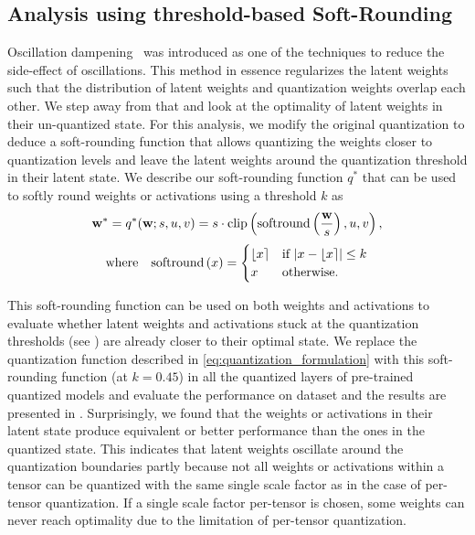 
\subsection{Analysis using threshold-based Soft-Rounding}

\label{sec:yolo-softround}
Oscillation dampening~\cite{nagel2022overcoming} was introduced as one of the techniques to reduce the side-effect of oscillations. This method in essence regularizes the latent weights such that the distribution of latent weights and quantization weights overlap each other. We step away from that and look at the optimality of latent weights in their un-quantized state. For this analysis, we modify the original quantization to deduce a soft-rounding function that allows quantizing the weights closer to quantization levels and leave the latent weights around the quantization threshold in their latent state. We describe our soft-rounding function $q^*$ that can be used to softly round weights or activations using a threshold $k$ as 
\begin{align}
    \label{eq:softrounding_formulation}
    \mathbf{w^*} = q^*(\mathbf{w}; s, u, v) = s \cdot \text{clip}\left(\text{softround}\left(\frac{\mathbf{w}}{s}\right),u,v\right),    
\end{align} 
\vspace{-2ex}
\begin{equation}
    \mbox{where}\quad \text{softround}\left(x\right) = \begin{cases}
    \lfloor x\rceil  & \text{if }  |x-\lfloor x\rceil| \leq k \\
    x   & \text{otherwise. } 
    \end{cases} \nonumber
\end{equation}

This soft-rounding function can be used on both weights and activations to evaluate whether latent weights and activations stuck at the quantization thresholds (see ) are already closer to their optimal state. We replace the quantization function described in \eqref{eq:quantization_formulation} with this soft-rounding function (at $k=0.45$) in all the quantized layers of pre-trained quantized \yolo{} models and evaluate the performance on \coco{} dataset and the results are presented in . Surprisingly, we found that the weights or activations in their latent state produce equivalent or better performance than the ones in the quantized state. This indicates that latent weights oscillate around the quantization boundaries partly because not all weights or activations within a tensor can be quantized with the same single scale factor as in the case of per-tensor quantization. If a single scale factor per-tensor is chosen, some weights can never reach optimality due to the limitation of per-tensor quantization.




